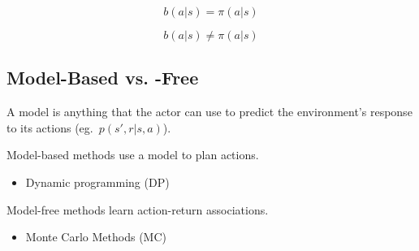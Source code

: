 \newpar{}
\noindent\begin{equation*}
    b(a|s) = \pi(a|s)
\end{equation*}

\newpar{}
\noindent\begin{equation*}
    b(a|s) \neq \pi(a|s)
\end{equation*}

\subsection{Model-Based vs. -Free}
A model is anything that the actor can use to predict the environment's response to its actions (eg.\ $p(s',r|s,a)$).

\newpar{}

Model-based methods use a model to plan actions.

\begin{itemize}
    \item Dynamic programming (DP)
\end{itemize}

\newpar{}

Model-free methods learn action-return associations.

\begin{itemize}
    \item Monte Carlo Methods (MC)
\end{itemize}